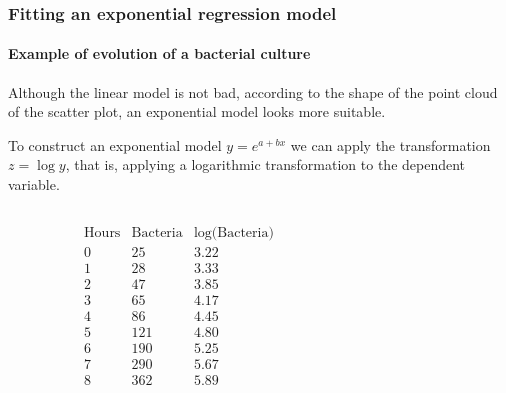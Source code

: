 \begin{frame}
\frametitle{Fitting an exponential regression model}
\framesubtitle{Example of evolution of a bacterial culture}
Although the linear model is not bad, according to the shape of the point cloud of the scatter plot, an exponential model looks more suitable. 

To construct an exponential model $y = e^{a+bx}$ we can apply the transformation $z=\log y$, that is, applying a logarithmic transformation to the dependent variable.
\begin{columns}
\begin{column}{0.45\textwidth}
\[
\begin{array}{c|c|c}
\mbox{Hours} & \mbox{Bacteria} & \mbox{$\log$(Bacteria)}\\
\hline
0 &  25 & 3.22\\
1 & 28 & 3.33\\
2 &  47 & 3.85\\
3 & 65  & 4.17\\
4 & 86 & 4.45\\
5 & 121 & 4.80\\
6 & 190 & 5.25\\
7 & 290 & 5.67\\
8 & 362 & 5.89
\end{array}
\]
\end{column}
\begin{column}{0.55\textwidth}
\begin{center}
\end{center}
\end{column}
\end{columns}
\end{frame}


